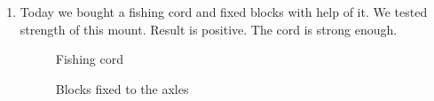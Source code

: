 \begin{enumerate}
\begin{enumerate}
		\item Today we bought a fishing cord and fixed blocks with help of it. We tested strength of this mount. Result is positive. The cord is strong enough.
		\begin{figure}[H]
			\begin{minipage}[h]{0.47\linewidth}
				\caption{Fishing cord}
			\end{minipage}
			\hfill
			\begin{minipage}[h]{0.47\linewidth}
				\caption{Blocks fixed to the axles}
			\end{minipage}
		\end{figure}
		

\end{enumerate}
\end{enumerate}
